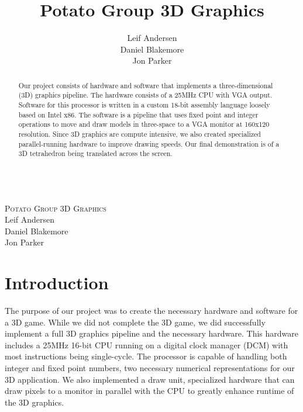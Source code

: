 \documentclass[onecolumn]{IEEEtran}
\title{Potato Group 3D Graphics}
\author{Leif Andersen\\Daniel Blakemore\\Jon Parker}
\begin{document}
\begin{titlepage}
\begin{center}
$ $\\
\vspace{100 mm}
\textsc{\Large Potato Group 3D Graphics}\\[2cm]
Leif Andersen\\Daniel Blakemore\\Jon Parker
\end{center}
\end{titlepage}



\pagebreak

\begin{abstract}
Our project consists of hardware and software that implements a three-dimensional (3D) graphics pipeline.  The hardware consists of a 25MHz CPU with VGA output.  Software for this processor is written in a custom 18-bit assembly language loosely based on Intel x86.  The software is a pipeline that uses fixed point and integer operations to move and draw models in three-space to a VGA monitor at 160x120 resolution.  Since 3D graphics are compute intensive, we also created specialized parallel-running hardware to improve drawing speeds.  Our final demonstration is of a 3D tetrahedron being translated across the screen.
\end{abstract}

\section{Introduction}
The purpose of our project was to create the necessary hardware and software for a 3D game.  While we did not complete the 3D game, we did successfully implement a full 3D graphics pipeline and the necessary hardware.  This hardware includes a 25MHz 16-bit CPU running on a digital clock manager (DCM) with most instructions being single-cycle.  The processor is capable of handling both integer and fixed point numbers, two necessary numerical representations for our 3D application.  We also implemented a draw unit, specialized hardware that can draw pixels to a monitor in parallel with the CPU to greatly enhance runtime of the 3D graphics.
\end{document}
